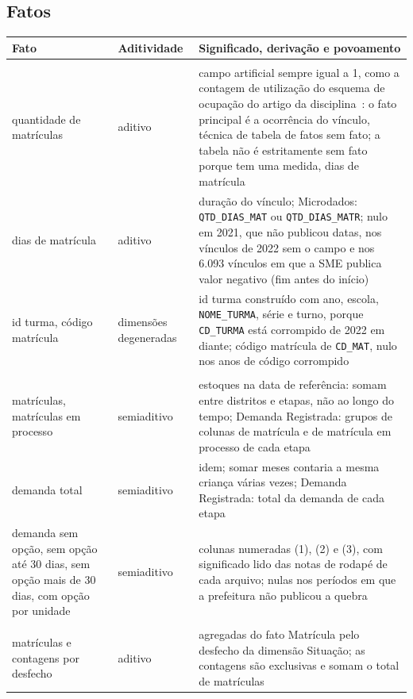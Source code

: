 \documentclass[11pt,a4paper]{article}
\newcommand{\cod}[1]{\texttt{#1}}
\begin{document}
\subsection{Fatos}

\begin{longtable}{>{\raggedright}p{4.0cm}>{\raggedright}p{2.4cm}>{\raggedright\arraybackslash}p{8.05cm}}
\toprule\textbf{Fato} & \textbf{Aditividade} & \textbf{Significado, derivação e povoamento}\\\midrule\endhead
\bottomrule\endlastfoot
\multicolumn{3}{l}{\textit{Tabela de fatos Matrícula}}\\
quantidade de matrículas & aditivo & campo artificial sempre igual a 1, como a contagem de utilização do esquema de ocupação do artigo da disciplina~\cite{ciferri-saude}: o fato principal é a ocorrência do vínculo, técnica de tabela de fatos sem fato; a tabela não é estritamente sem fato porque tem uma medida, dias de matrícula \\
dias de matrícula & aditivo & duração do vínculo; Microdados: \cod{QTD_DIAS_MAT} ou \cod{QTD_DIAS_MATR}; nulo em 2021, que não publicou datas, nos vínculos de 2022 sem o campo e nos 6.093 vínculos em que a SME publica valor negativo (fim antes do início) \\
id turma, código matrícula & dimensões degeneradas & id turma construído com ano, escola, \cod{NOME_TURMA}, série e turno, porque \cod{CD_TURMA} está corrompido de 2022 em diante; código matrícula de \cod{CD_MAT}, nulo nos anos de código corrompido \\
\midrule
\multicolumn{3}{l}{\textit{Tabela de fatos Fila}}\\
matrículas, matrículas em processo & semiaditivo & estoques na data de referência: somam entre distritos e etapas, não ao longo do tempo; Demanda Registrada: grupos de colunas de matrícula e de matrícula em processo de cada etapa \\
demanda total & semiaditivo & idem; somar meses contaria a mesma criança várias vezes; Demanda Registrada: total da demanda de cada etapa \\
demanda sem opção, sem opção até 30 dias, sem opção mais de 30 dias, com opção por unidade & semiaditivo & colunas numeradas (1), (2) e (3), com significado lido das notas de rodapé de cada arquivo; nulas nos períodos em que a prefeitura não publicou a quebra \\
\midrule
\multicolumn{3}{l}{\textit{Tabela de fatos Desfecho}}\\
matrículas e contagens por desfecho & aditivo & agregadas do fato Matrícula pelo desfecho da dimensão Situação; as contagens são exclusivas e somam o total de matrículas \\

\end{longtable}
\end{document}
